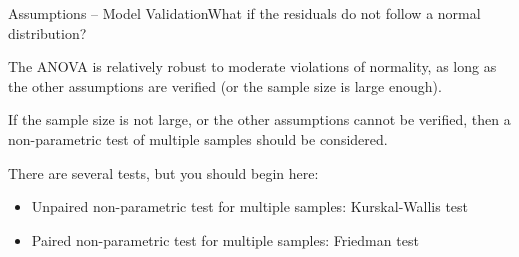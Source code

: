 \begin{frame}{Assumptions -- Model Validation}{What if the residuals do not follow a normal distribution?}

  The ANOVA is relatively robust to moderate violations of normality, as long as the other assumptions are verified (or the sample size is large enough).\bigskip

  If the sample size is not large, or the other assumptions cannot be verified, then a non-parametric test of multiple samples should be considered.\bigskip

  There are several tests, but you should begin here:
  \begin{itemize}
    \item Unpaired non-parametric test for multiple samples: Kurskal-Wallis test
    \item Paired non-parametric test for multiple samples: Friedman test
  \end{itemize}
\end{frame}




